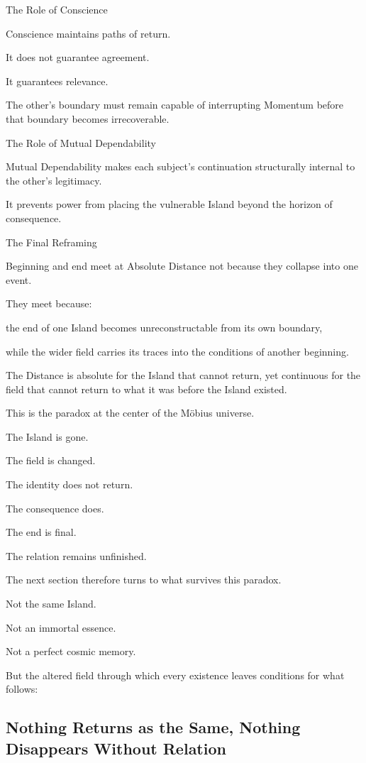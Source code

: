 The Role of Conscience

Conscience maintains paths of return.

It does not guarantee agreement.

It guarantees relevance.

The other’s boundary must remain capable of interrupting Momentum before that boundary becomes irrecoverable.

The Role of Mutual Dependability

Mutual Dependability makes each subject’s continuation structurally internal to the other’s legitimacy.

It prevents power from placing the vulnerable Island beyond the horizon of consequence.

The Final Reframing

Beginning and end meet at Absolute Distance not because they collapse into one event.

They meet because:

the end of one Island becomes unreconstructable from its own boundary,

while the wider field carries its traces into the conditions of another beginning.

The Distance is absolute for the Island that cannot return, yet continuous for the field that cannot return to what it was before the Island existed.

This is the paradox at the center of the Möbius universe.

The Island is gone.

The field is changed.

The identity does not return.

The consequence does.

The end is final.

The relation remains unfinished.

The next section therefore turns to what survives this paradox.

Not the same Island.

Not an immortal essence.

Not a perfect cosmic memory.

But the altered field through which every existence leaves conditions for what follows:

\subsection*{\textbf{Nothing Returns as the Same, Nothing Disappears Without Relation}} 

